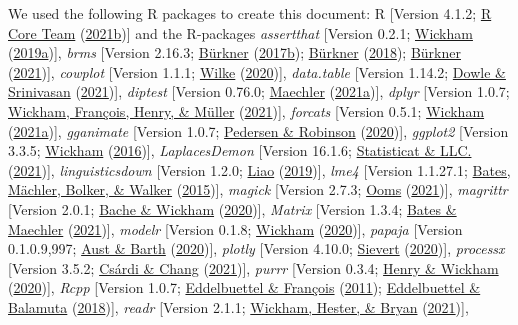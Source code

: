 \documentclass[
  11pt,
  english,
  man,floatsintext]{apa6}
\begin{document}
We used the following R packages to create this document: R {[}Version 4.1.2; \protect\hyperlink{ref-R-base}{R Core Team} (\protect\hyperlink{ref-R-base}{2021b}){]} and the R-packages \emph{assertthat} {[}Version 0.2.1; \protect\hyperlink{ref-R-assertthat}{Wickham} (\protect\hyperlink{ref-R-assertthat}{2019a}){]}, \emph{brms} {[}Version 2.16.3; \protect\hyperlink{ref-R-brms_a}{Bürkner} (\protect\hyperlink{ref-R-brms_a}{2017b}); \protect\hyperlink{ref-R-brms_b}{Bürkner} (\protect\hyperlink{ref-R-brms_b}{2018}); \protect\hyperlink{ref-R-brms_c}{Bürkner} (\protect\hyperlink{ref-R-brms_c}{2021}){]}, \emph{cowplot} {[}Version 1.1.1; \protect\hyperlink{ref-R-cowplot}{Wilke} (\protect\hyperlink{ref-R-cowplot}{2020}){]}, \emph{data.table} {[}Version 1.14.2; \protect\hyperlink{ref-R-data.table}{Dowle \& Srinivasan} (\protect\hyperlink{ref-R-data.table}{2021}){]}, \emph{diptest} {[}Version 0.76.0; \protect\hyperlink{ref-R-diptest}{Maechler} (\protect\hyperlink{ref-R-diptest}{2021a}){]}, \emph{dplyr} {[}Version 1.0.7; \protect\hyperlink{ref-R-dplyr}{Wickham, François, Henry, \& Müller} (\protect\hyperlink{ref-R-dplyr}{2021}){]}, \emph{forcats} {[}Version 0.5.1; \protect\hyperlink{ref-R-forcats}{Wickham} (\protect\hyperlink{ref-R-forcats}{2021a}){]}, \emph{gganimate} {[}Version 1.0.7; \protect\hyperlink{ref-R-gganimate}{Pedersen \& Robinson} (\protect\hyperlink{ref-R-gganimate}{2020}){]}, \emph{ggplot2} {[}Version 3.3.5; \protect\hyperlink{ref-R-ggplot2}{Wickham} (\protect\hyperlink{ref-R-ggplot2}{2016}){]}, \emph{LaplacesDemon} {[}Version 16.1.6; \protect\hyperlink{ref-R-LaplacesDemon}{Statisticat \& LLC.} (\protect\hyperlink{ref-R-LaplacesDemon}{2021}){]}, \emph{linguisticsdown} {[}Version 1.2.0; \protect\hyperlink{ref-R-linguisticsdown}{Liao} (\protect\hyperlink{ref-R-linguisticsdown}{2019}){]}, \emph{lme4} {[}Version 1.1.27.1; \protect\hyperlink{ref-R-lme4}{Bates, Mächler, Bolker, \& Walker} (\protect\hyperlink{ref-R-lme4}{2015}){]}, \emph{magick} {[}Version 2.7.3; \protect\hyperlink{ref-R-magick}{Ooms} (\protect\hyperlink{ref-R-magick}{2021}){]}, \emph{magrittr} {[}Version 2.0.1; \protect\hyperlink{ref-R-magrittr}{Bache \& Wickham} (\protect\hyperlink{ref-R-magrittr}{2020}){]}, \emph{Matrix} {[}Version 1.3.4; \protect\hyperlink{ref-R-Matrix}{Bates \& Maechler} (\protect\hyperlink{ref-R-Matrix}{2021}){]}, \emph{modelr} {[}Version 0.1.8; \protect\hyperlink{ref-R-modelr}{Wickham} (\protect\hyperlink{ref-R-modelr}{2020}){]}, \emph{papaja} {[}Version 0.1.0.9,997; \protect\hyperlink{ref-R-papaja}{Aust \& Barth} (\protect\hyperlink{ref-R-papaja}{2020}){]}, \emph{plotly} {[}Version 4.10.0; \protect\hyperlink{ref-R-plotly}{Sievert} (\protect\hyperlink{ref-R-plotly}{2020}){]}, \emph{processx} {[}Version 3.5.2; \protect\hyperlink{ref-R-processx}{Csárdi \& Chang} (\protect\hyperlink{ref-R-processx}{2021}){]}, \emph{purrr} {[}Version 0.3.4; \protect\hyperlink{ref-R-purrr}{Henry \& Wickham} (\protect\hyperlink{ref-R-purrr}{2020}){]}, \emph{Rcpp} {[}Version 1.0.7; \protect\hyperlink{ref-R-Rcpp_a}{Eddelbuettel \& François} (\protect\hyperlink{ref-R-Rcpp_a}{2011}); \protect\hyperlink{ref-R-Rcpp_b}{Eddelbuettel \& Balamuta} (\protect\hyperlink{ref-R-Rcpp_b}{2018}){]}, \emph{readr} {[}Version 2.1.1; \protect\hyperlink{ref-R-readr}{Wickham, Hester, \& Bryan} (\protect\hyperlink{ref-R-readr}{2021}){]}, 
\end{document}
